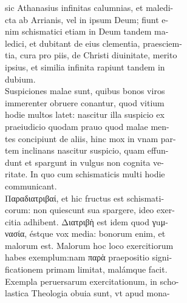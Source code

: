 \documentclass{article}
\begin{document}
\begin{pages}
                sic Athanasius infinitas calumnias, et maledi- \\
                cta ab Arrianis, vel in ipsum Deum; fiunt e- \\
                nim schismatici etiam in Deum tandem ma- \\
                ledici, et dubitant de eius clementia, praesciem- \\
                tia, cura pro piis, de Christi diuinitate, merito \\
                ipsius, et similia infinita rapiunt tandem in \\
                dubium. \\
                Suspiciones malae sunt, quibus bonos viros \\
                immerenter obruere conantur, quod vitium \\
                hodie multos latet: nascitur illa suspicio ex \\
                praeiudicio quodam prauo quod malae men- \\
                tes concipiunt de aliis, hinc mox in vnam par- \\
                tem inclinans nascitur suspicio, quam effun- \\
                dunt et spargunt in vulgus non cognita ve- \\
                ritate. In quo cum schismaticis multi hodie \\
                communicant. \\
                Παραδιατριβαί, et hic fructus est schismati- \\
                corum: non quiescunt sua spargere, ideo exer- \\
                citia adhibent. Διατριβὴ est idem quod γuμ- \\
                νασία, éstque vox media: bonorum enim, et \\
                malorum est. Malorum hoc loco exercitiorum \\
                habes exemplum:nam παρὰ praepositio signi- \\
                ficationem primam limitat, malámque facit. \\
                Exempla peruersarum exercitationum, in scho- \\
                lastica Theologia obuia sunt, vt apud mona- \\
\end{pages}
\end{document}

